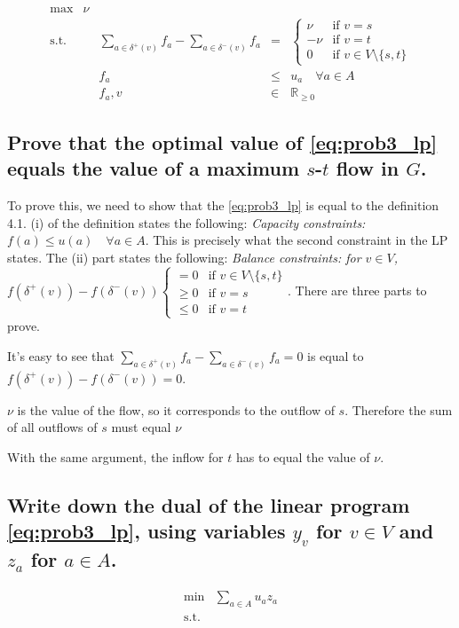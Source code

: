 \documentclass[12pt, a4]{article}
\begin{document}
\begin{equation}
	\begin{array}{llrcl}
		\max & \nu \\
		\text{s.t.} && \sum_{a\in\delta^+(v)}f_a - \sum_{a\in\delta^-(v)}f_a & = & \begin{cases}
			\nu &\text{if } v=s \\
			-\nu & \text{if } v=t \\
			0 & \text{if } v\in V \setminus \{s,t\}
			\end{cases} \\
		&& f_a & \leq & u_a \quad \forall a \in A \\
		&& f_a, v & \in & \mathbb{R}_{\geq 0}
	\end{array}
\label{eq:prob3_lp}
\end{equation}
\subsection{Prove that the optimal value of \autoref{eq:prob3_lp} equals the value of a maximum $s$-$t$ flow in $G$.}
To prove this, we need to show that the \autoref{eq:prob3_lp} is equal to the definition 4.1. (i) of the definition states the following: \textit{Capacity constraints: $f(a) \leq u(a) \quad \forall a \in A$}. This is precisely what the second constraint in the LP states. The (ii) part states the following: \textit{Balance constraints: for $v\in V$, $f(\delta^+(v)) - f(\delta^-(v)) \begin{cases}
=0 & \text{if } v \in V \setminus \{s,t\} \\
\geq 0 & \text{if } v = s \\
\leq 0 & \text{if } v = t
\end{cases}$}. There are three parts to prove. 

It's easy to see that $\sum_{a\in\delta^+(v)}f_a - \sum_{a\in\delta^-(v)}f_a = 0$ is equal to $f(\delta^+(v)) - f(\delta^-(v)) = 0$. 

$\nu$ is the value of the flow, so it corresponds to the outflow of $s$. Therefore the sum of all outflows of $s$ must equal $\nu$

With the same argument, the inflow for $t$ has to equal the value of $\nu$.

\subsection{Write down the dual of the linear program \autoref{eq:prob3_lp}, using variables $y_v$ for $v\in V$ and $z_a$ for $a\in A$.}

\begin{equation}
	\begin{array}{llrcl}
		\min & \sum_{a\in A} u_a z_a  \\
		\text{s.t.} 
	\end{array}
	\label{eq:prob3_lp}
\end{equation}
\end{document}
